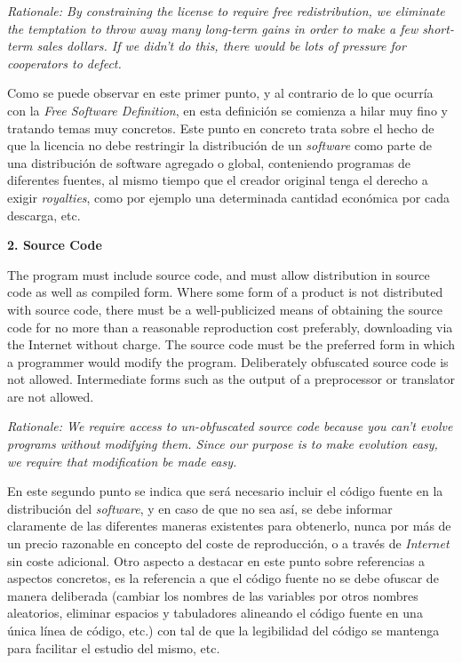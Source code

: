 \textit{Rationale: By constraining the license to require free redistribution,
we eliminate the temptation to throw away many long-term gains in order to make
a few short-term sales dollars. If we didn't do this, there would be lots
of pressure for cooperators to defect.}\newline

Como se puede observar en este primer punto, y al contrario de lo que ocurría
con la \textit{Free Software Definition}, en esta definición se comienza a hilar
muy fino y tratando temas muy concretos. Este punto en concreto trata sobre
el hecho de que la licencia no debe restringir la distribución de un
\textit{software} como parte de una distribución de software agregado o global,
conteniendo programas de diferentes fuentes, al mismo tiempo que el creador
original tenga el derecho a exigir \textit{royalties}, como por ejemplo una
determinada cantidad económica por cada descarga, etc.\newline

{\bf 2. Source Code

The program must include source code, and must allow distribution in source code
as well as compiled form. Where some form of a product is not distributed with
source code, there must be a well-publicized means of obtaining the source code
for no more than a reasonable reproduction cost preferably, downloading via the
Internet without charge. The source code must be the preferred form in which a
programmer would modify the program. Deliberately obfuscated source code is not
allowed. Intermediate forms such as the output of a preprocessor or translator
are not allowed.}

\textit{Rationale: We require access to un-obfuscated source code because you
can't evolve programs without modifying them. Since our purpose is to make
evolution easy, we require that modification be made easy.}\newline

En este segundo punto se indica que será necesario incluir el código fuente en
la distribución del \textit{software}, y en caso de que no sea así, se debe
informar claramente de las diferentes maneras existentes para obtenerlo, nunca
por más de un precio razonable en concepto del coste de reproducción, o a través
de \textit{Internet} sin coste adicional. Otro aspecto a destacar en este punto
sobre referencias a aspectos concretos, es la referencia a que el código fuente
no se debe ofuscar de manera deliberada (cambiar los nombres de las variables
por otros nombres aleatorios, eliminar espacios y tabuladores alineando el
código fuente en una única línea de código, etc.) con tal de que la legibilidad
del código se mantenga para facilitar el estudio del mismo, etc.\newline

